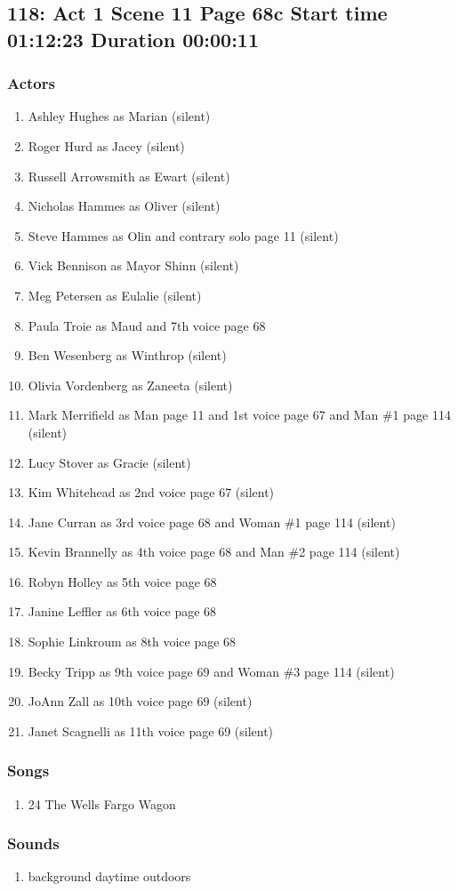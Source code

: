 \subsection{118: Act 1 Scene 11 Page 68c Start time 01:12:23 Duration 00:00:11}

\subsubsection{Actors}
\begin{enumerate}
\item Ashley Hughes as Marian (silent)
\item Roger Hurd as Jacey (silent)
\item Russell Arrowsmith as Ewart (silent)
\item Nicholas Hammes as Oliver (silent)
\item Steve Hammes as Olin and contrary solo page 11 (silent)
\item Vick Bennison as Mayor Shinn (silent)
\item Meg Petersen as Eulalie (silent)
\item Paula Troie as Maud and 7th voice page 68
\item Ben Wesenberg as Winthrop (silent)
\item Olivia Vordenberg as Zaneeta (silent)
\item Mark Merrifield as Man page 11 and 1st voice page 67 and Man \#1 page 114 (silent)
\item Lucy Stover as Gracie (silent)
\item Kim Whitehead as 2nd voice page 67 (silent)
\item Jane Curran as 3rd voice page 68 and Woman \#1 page 114 (silent)
\item Kevin Brannelly as 4th voice page 68 and Man \#2 page 114 (silent)
\item Robyn Holley as 5th voice page 68
\item Janine Leffler as 6th voice page 68
\item Sophie Linkroum as 8th voice page 68
\item Becky Tripp as 9th voice page 69 and Woman \#3 page 114 (silent)
\item JoAnn Zall as 10th voice page 69 (silent)
\item Janet Scagnelli as 11th voice page 69 (silent)
\end{enumerate}

\subsubsection{Songs}
\begin{enumerate}
\item 24 The Wells Fargo Wagon
\end{enumerate}\subsubsection{Sounds}
\begin{enumerate}
\item background daytime outdoors
\end{enumerate}
